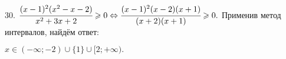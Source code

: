 30. $\cfrac{(x-1)^2(x^2-x-2)}{x^2+3x+2}\geqslant0\Leftrightarrow\cfrac{(x-1)^2(x-2)(x+1)}{(x+2)(x+1)}\geqslant0.$
Применив метод интервалов, найдём ответ:
\begin{figure}[ht!]
\end{figure}
$x\in(-\infty;-2)\cup\{1\}\cup[2;+\infty).$\\
